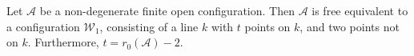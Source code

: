 Let $\mathcal{A}$ be a non-degenerate finite open configuration. Then $\mathcal{A}$ is free equivalent to a configuration $\mathcal{W}_1$, consisting of a line $k$ with $t$ points on $k$, and two points not on $k$. Furthermore, $t = r_0(\mathcal{A}) - 2$.
